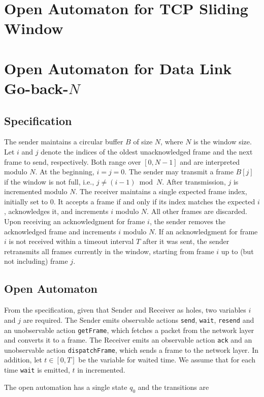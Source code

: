 \section{Open Automaton for TCP Sliding Window}

\section{Open Automaton for Data Link Go-back-\texorpdfstring{$N$}{N}}
\subsection{Specification}

The sender maintains a circular buffer $B$ of size $N$, where $N$ is the window size. Let $i$ and $j$ denote the indices of the oldest unacknowledged frame and the next frame to send, respectively. Both range over $[0, N-1]$ and are interpreted modulo $N$. At the beginning, $i = j = 0$. The sender may transmit a frame $B[j]$ if the window is not full, i.e., $j \neq (i - 1) \bmod N$. After transmission, $j$ is incremented modulo $N$. The receiver maintains a single expected frame index, initially set to $0$. It accepts a frame if and only if its index matches the expected $i$, acknowledges it, and increments $i$ modulo $N$. All other frames are discarded. Upon receiving an acknowledgment for frame $i$, the sender removes the acknowledged frame and increments $i$ modulo $N$. If an acknowledgment for frame $i$ is not received within a timeout interval $T$ after it was sent, the sender retransmits all frames currently in the window, starting from frame $i$ up to (but not including) frame $j$.

\subsection{Open Automaton}
From the specification, given that Sender and Receiver as holes, two variables $i$ and $j$ are required. The Sender emits observable actions \texttt{send}, \texttt{wait}, \texttt{resend} and an unobservable action \texttt{getFrame}, which fetches a packet from the network layer and converts it to a frame. The Receiver emits an observable action \texttt{ack} and an unobservable action \texttt{dispatchFrame}, which sends a frame to the network layer. In addition, let $t\in[0,T]$ be the variable for waited time. We assume that for each time \texttt{wait} is emitted, $t$ in incremented.

The open automation has a single state $q_0$ and the transitions are

